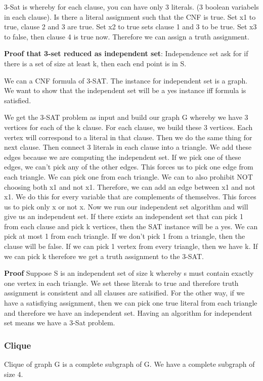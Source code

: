 \documentclass[11pt, oneside]{article}
\theoremstyle{definition}
\begin{document}
3-Sat is whereby for each clause, you can have only 3 literals. (3 boolean variabels in each clause). Is there a literal assignment such that the CNF is true. Set x1 to true, clause 2 and 3 are true. Set x2 to true sets clause 1 and 3 to be true. Set x3 to false, then clause 4 is true now. Therefore we can assign a truth assignment.

\textbf{Proof that 3-set reduced as independent set}:
Independence set ask for if there is a set of size at least k, then each end point is in S.

We can a CNF formula of 3-SAT. The instance for independent set is a graph. We want to show that the independent set will be a yes instance iff formula is satisfied.

We get the 3-SAT problem as input and build our graph G whereby we have 3 vertices for each of the k clause. For each clause, we build these 3 vertices. Each vertex will correspond to a literal in that clause. Then we do the same thing for next clause. Then connect 3 literals in each clause into a triangle. We add these edges because we are computing the independent set. If we pick one of these edges, we can't pick any of the other edges. This forces us to pick one edge from each triangle. We can pick one from each triangle. We can to also prohibit NOT choosing both x1 and not x1. Therefore, we can add an edge between x1 and not x1. We do this for every variable that are complements of themselves. This forces us to pick only x or not x. Now we run our independent set algorithm and will give us an independent set. If there exists an independent set that can pick 1 from each clause and pick k vertices, then the SAT instance will be a yes. We can pick at most 1 from each triangle. If we don't pick 1 from a triangle, then the clause will be false. If we can pick 1 vertex from every triangle, then we have k. If we can pick k therefore we get a truth assignment to the 3-SAT.

\textbf{Proof}
Suppose S is an independent set of size k whereby s must contain exactly one vertex in each triangle. We set these literals to true and therefore truth assignment is consistent and all clauses are satisified. For the other way, if we have a satisfiying assignment, then we can pick one true literal from each triangle and therefore we have an independent set. Having an algorithm for independent set means we have a 3-Sat problem.

\subsubsection{Clique}
Clique of graph G is a complete subgraph of G. We have a complete subgraph of size 4.
\end{document}
